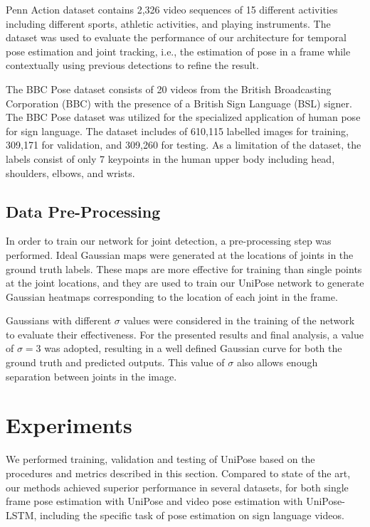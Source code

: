 \documentclass[10pt,twocolumn,letterpaper]{article}
\begin{document}
Penn Action \cite{PennAction} dataset contains 2,326 video sequences of 15 different activities including different sports, athletic activities, and playing instruments. The dataset was used to evaluate the performance of our architecture for temporal pose estimation and joint tracking, i.e., the estimation of pose in a frame while contextually using previous detections to refine the result.

The BBC Pose dataset \cite{BBC} consists of 20 videos from the British Broadcasting Corporation (BBC) with the presence of a British Sign Language (BSL) signer. The BBC Pose dataset was utilized for the specialized application of human pose for sign language. 
The dataset includes of 610,115 labelled images for training, 309,171 for validation, and 309,260 for testing. As a limitation of the dataset, the labels consist of only 7 keypoints in the human upper body including head, shoulders, elbows, and wrists.

\subsection{Data Pre-Processing}
In order to train our network for joint detection, a pre-processing step was performed. 
Ideal Gaussian maps were generated at the locations of joints in the ground truth labels.
These maps are more effective for training than single points at the joint locations, and they are used to train our UniPose network to generate Gaussian heatmaps corresponding to the location of each joint in the frame.

Gaussians with different $\sigma$ values were considered in the training of the network to evaluate their effectiveness. For the presented results and final analysis, a value of $\sigma=3$ was adopted, resulting in a well defined Gaussian curve for both the ground truth and predicted outputs. This value of $\sigma$ also allows enough separation between joints in the image.













\section{Experiments}
We performed training, validation and testing of UniPose based on the procedures and metrics described in this section.  
Compared to state of the art, our methods achieved superior performance in several datasets, for both single frame pose estimation with UniPose and video pose estimation with UniPose-LSTM, including the specific task of pose estimation on sign language videos.
\end{document}
